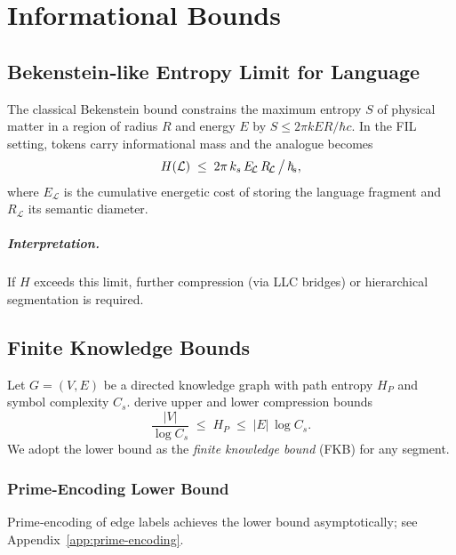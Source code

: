 
\chapter{Informational Bounds}\label{chap:bounds}

\section{Bekenstein‑like Entropy Limit for Language}

The classical Bekenstein bound \cite{bekenstein1981} constrains the maximum entropy $S$ of physical matter in a region of radius $R$ and energy $E$ by $S\le 2\pi k E R/\hbar c$.  In the FIL setting, tokens carry informational mass and the analogue becomes
\begin{equation}
  H(\mathcal L) \;\le\; 2\pi\,k_s\,E_{\!\mathcal L}\,R_{\!\mathcal L}\,\big/\,\hbar_{\!s},
\end{equation}
where $E_{\!\mathcal L}$ is the cumulative energetic cost of storing the language fragment and $R_{\!\mathcal L}$ its semantic diameter.

\paragraph{Interpretation.}  If $H$ exceeds this limit, further compression (via LLC bridges) or hierarchical segmentation is required.

\section{Finite Knowledge Bounds}

Let $G=(V,E)$ be a directed knowledge graph with path entropy $H_P$ and symbol complexity $C_s$.  \textcite{finiteknowledgebounds2025} derive upper and lower compression bounds
\begin{equation}
  \frac{|V|}{\log C_s}\;\le\;H_P\;\le\;|E|\,\log C_s.
\end{equation}
We adopt the lower bound as the \emph{finite knowledge bound} (FKB) for any segment.

\subsection{Prime‑Encoding Lower Bound}
Prime‑encoding of edge labels achieves the lower bound asymptotically; see Appendix~\ref{app:prime-encoding}.

